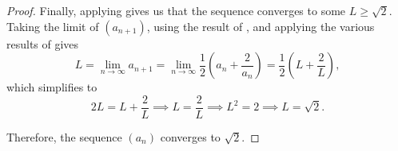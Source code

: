 \begin{problem}
\begin{proof}
    Finally, applying  gives us that the
    sequence converges to some $L \geq \sqrt{2}$. Taking the limit of $(a_{n+1})$,
    using the result of ,
    and applying the various results of
     gives
    \[
      L = \lim_{n \to \infty} a_{n+1} = \lim_{n \to \infty} \frac{1}{2} \left( a_n + \frac{2}{a_n} \right)
      = \frac{1}{2} \left( L + \frac{2}{L} \right),
    \]
    which simplifies to
    \[
      2L = L + \frac{2}{L} \implies L = \frac{2}{L} \implies L^2 = 2 \implies L = \sqrt{2}.
    \]

    Therefore, the sequence $(a_n)$ converges to $\sqrt{2}$.
  \end{proof}
\end{problem}
